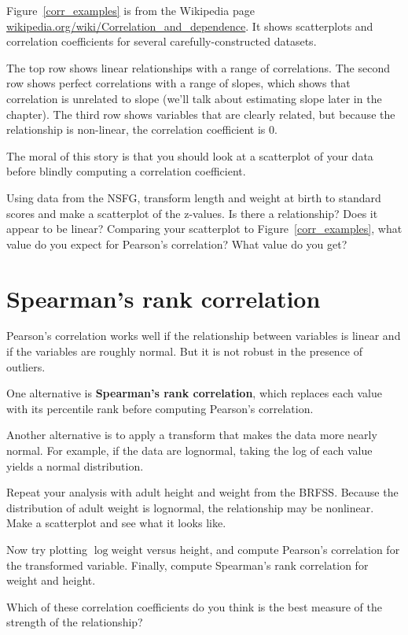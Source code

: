 \documentclass[12pt]{book}
\begin{document}
Figure~\ref{corr_examples} is from the Wikipedia page
\url{wikipedia.org/wiki/Correlation_and_dependence}.  It shows
scatterplots and correlation coefficients for several
carefully-constructed datasets.

The top row shows linear relationships with a range
of correlations.  The second row shows perfect correlations with a range
of slopes, which shows that correlation is unrelated to slope
(we'll talk about estimating slope later in the chapter).  The third
row shows variables that are clearly related, but because the relationship
is non-linear, the correlation coefficient is 0.

The moral of this story is that you should look at a scatterplot of
your data before blindly computing a correlation coefficient.

\begin{ex}

Using data from the NSFG, transform length and weight at birth to
standard scores and make a scatterplot of the z-values.  Is there
a relationship?  Does it appear to be linear?  Comparing your scatterplot
to Figure~\ref{corr_examples}, what value do you expect for Pearson's
correlation?  What value do you get?

\end{ex}


\section{Spearman's rank correlation}

Pearson's correlation works well if the relationship between variables
is linear and if the variables are roughly normal.  But it is not
robust in the presence of outliers.

One alternative is {\bf Spearman's rank correlation}, which replaces
each value with its percentile rank before computing Pearson's
correlation.

Another alternative is to apply a transform that makes the data more
nearly normal.  For example, if the data are lognormal, taking the log
of each value yields a normal distribution.

\begin{ex}

Repeat your analysis with adult height and weight from the BRFSS.
Because the distribution of adult weight is lognormal, the relationship
may be nonlinear.  Make a scatterplot and see what it looks like.

Now try plotting $\log \mathrm{weight}$ versus height, and compute
Pearson's correlation for the transformed variable.
Finally, compute Spearman's rank correlation for weight and height.

Which of these correlation coefficients do you think is the best
measure of the strength of the relationship?

\end{ex}
\end{document}
